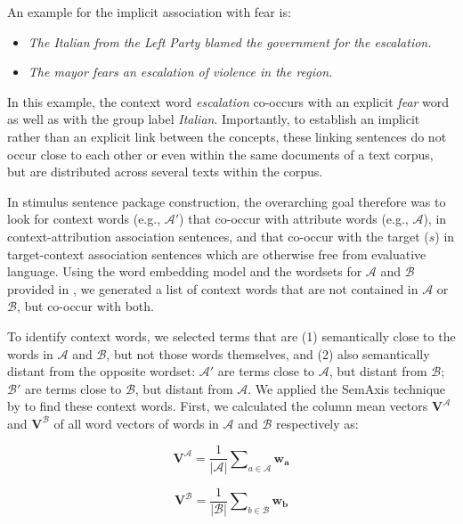 An example for the implicit association with fear is:

\begin{itemize}
    \item \textit{The Italian from the Left Party blamed the government for the escalation.}
    \item \textit{The mayor fears an escalation of violence in the region.}
\end{itemize}

In this example, the context word \textit{escalation} co-occurs with an explicit \textit{fear} word as well as with the group label \textit{Italian}. Importantly, to establish an implicit rather than an explicit link between the concepts, these linking sentences do not occur close to each other or even within the same documents of a text corpus, but are distributed across several texts within the corpus. 

In stimulus sentence package construction, the overarching goal therefore was to look for context words (e.g., $\mathcal{A'}$) that co-occur with attribute words (e.g., $\mathcal{A}$), in context-attribution association sentences, and that co-occur with the target ($s$) in target-context association sentences which are otherwise free from evaluative language. Using the word embedding model and the wordsets for $\mathcal{A}$ and $\mathcal{B}$ provided in \textcite{mueller:2023:DRN}, we generated a list of context words that are not contained in $\mathcal{A}$ or $\mathcal{B}$, but co-occur with both.

To identify context words, we selected terms that are (1) semantically close to the words in $\mathcal{A}$ and $\mathcal{B}$, but not those words themselves, and (2) also semantically distant from the opposite wordset: $\mathcal{A'}$ are terms close to $\mathcal{A}$, but distant from $\mathcal{B}$; $\mathcal{B'}$ are terms close to $\mathcal{B}$, but distant from $\mathcal{A}$. We applied the SemAxis technique by \textcite{an2018semaxis} to find these context words. First, we calculated the column mean vectors $\mathbf{V}^{\mathcal{A}}$ and $\mathbf{V}^{\mathcal{B}}$ of all word vectors of words in $\mathcal{A}$ and $\mathcal{B}$ respectively as:

\begin{equation}
\mathbf{V}^{\mathcal{A}} = \frac{1}{|\mathcal{A}|} \sum\nolimits_{a \in \mathcal{A}} \boldsymbol{w_a}
\end{equation}

\begin{equation}
\mathbf{V}^{\mathcal{B}} = \frac{1}{|\mathcal{B}|} \sum\nolimits_{b \in \mathcal{B}} \boldsymbol{w_b}
\end{equation}

